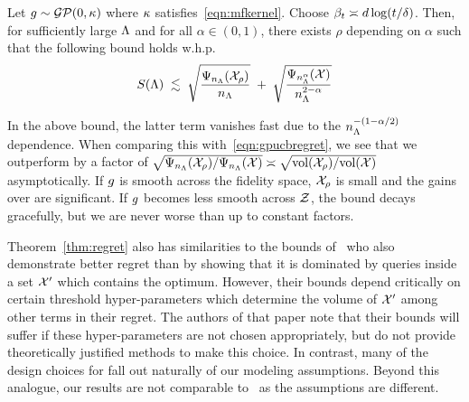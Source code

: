 \begin{theorem}
\label{thm:regret}
Let $g\sim\mathcal{G}\mathcal{P}(0,\kappa)$ where $\kappa$ satisfies~\eqref{eqn:mfkernel}.
Choose $\beta_t \asymp d\log(t/\delta)$.
Then, for sufficiently large $\Lambda$ and for all $\alpha \in(0,1)$, there exists $\rho$
depending on $\alpha$ such that the following bound holds w.h.p.
\[
S(\Lambda) \;\lesssim\;
  \sqrt{\frac{\Psi_{n_\Lambda}(\mathcal{X}_\rho)}{n_\Lambda}}
  \;+\;
  \sqrt{\frac{\Psi_{n_\Lambda^\alpha}(\mathcal{X})}{n_\Lambda^{2-\alpha}}}
\]
\end{theorem}
In the above bound, the latter term vanishes fast due to the $n_\Lambda^{-(1-\alpha/2)}$
dependence.
When comparing this with~\eqref{eqn:gpucbregret},
we see that we outperform \gpucbs by a factor of
$\sqrt{\Psi_{n_\Lambda}(\mathcal{X}_\rho)/\Psi_{n_\Lambda}(\mathcal{X})} \asymp \sqrt{{\bf{\rm vol}}(\mathcal{X}_\rho)/{\bf{\rm vol}}(\mathcal{X})}$
asymptotically.
If $g$ is smooth across the fidelity space, $\mathcal{X}_\rho$ is small and
the gains over \gpucbs are significant.
If $g$ becomes less smooth across $\mathcal{Z}$, the bound decays gracefully, but
we are never worse than \gpucbs up to constant factors.

Theorem~\ref{thm:regret} also has similarities to the bounds 
of~\citet{kandasamy16mfbo} who also demonstrate better regret than \gpucbs by
showing that it is dominated by queries inside a set $\mathcal{X}'$ which contains the optimum.
However, their bounds  depend critically on certain threshold hyper-parameters
which determine the volume of $\mathcal{X}'$ among other  terms in their regret.
The authors of that paper note that their bounds will suffer if these hyper-parameters are not
chosen appropriately, but do not provide theoretically justified methods to make this choice.
In contrast, many of the design choices for \bocas fall out naturally of 
our modeling assumptions.
Beyond this analogue, our results are not comparable to~\citet{kandasamy16mfbo}
as the assumptions are different.

